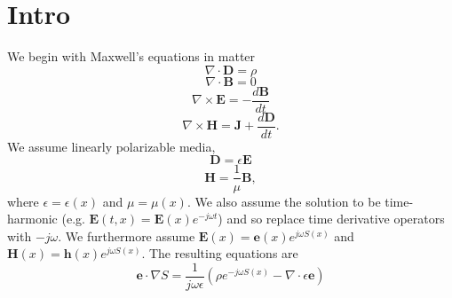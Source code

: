 \documentclass{article}
\theoremstyle{plain}
\begin{document}
\section{Intro}\label{sec:intro}

We begin with Maxwell's equations in matter
\begin{equation}
	\nabla\cdot\mathbf{D} = \rho
\end{equation}
\begin{equation}
	\nabla\cdot\mathbf{B} = 0
\end{equation}
\begin{equation}
	\nabla\times\mathbf{E} = -\frac{d\mathbf{B}}{dt}
\end{equation}
\begin{equation}
	\nabla\times\mathbf{H} = \mathbf{J} + \frac{d\mathbf{D}}{dt}.
\end{equation}
We assume linearly polarizable media,
\begin{equation}
	\mathbf{D} = \epsilon\mathbf{E}
\end{equation}
\begin{equation}
	\mathbf{H} = \frac{1}{\mu}\mathbf{B},
\end{equation}
where $\epsilon=\epsilon(x)$ and $\mu=\mu(x)$. We also assume the solution to be time-harmonic (e.g. $\mathbf{E}(t,x)=\mathbf{E}(x)e^{-j\omega t}$) and so replace time derivative operators with $-j\omega$. We furthermore assume $\mathbf{E}(x) = \mathbf{e}(x)e^{j\omega S(x)}$ and $\mathbf{H}(x) = \mathbf{h}(x)e^{j\omega S(x)}$. The resulting equations are
\begin{equation}\label{eq:max1}
	\mathbf{e}\cdot\nabla S = \frac{1}{j\omega\epsilon}\left( \rho e^{-j\omega S(x)} - \nabla\cdot\epsilon\mathbf{e} \right)
\end{equation}
\end{document}
